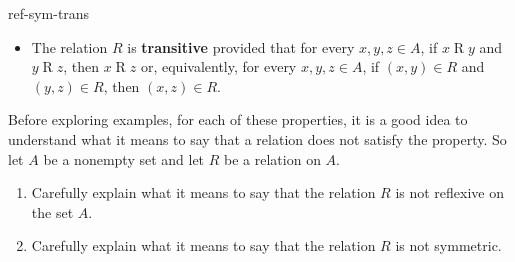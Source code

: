 \begin{previewactivity}
\begin{defbox}{ref-sym-trans}
{\begin{itemize}
\item The relation  $R$  is \textbf{transitive}
%
%
  provided that for every $x, y, z \in A$,  if  $x \mathrel{R} y$ and  $y \mathrel{R} z$, then  $x \mathrel{R} z$ or, equivalently, for every  $x, y, z \in A$,  if  $\left( {x, y} \right) \in R$ and $\left( {y, z} \right) \in R$, then  $\left( {x, z} \right) \in R$.
\end{itemize}
}
\end{defbox}
Before exploring examples, for each of these properties, it is a good idea to understand what it means to say that a relation does not satisfy the property.  So let  $A$  be a nonempty set and let  $R$  be a relation on  $A$. 
\begin{enumerate}
\item Carefully explain what it means to say that the relation  $R$  is not reflexive on the set  $A$.

\item Carefully explain what it means to say that the relation  $R$  is not symmetric.


\end{enumerate}
\end{previewactivity}
